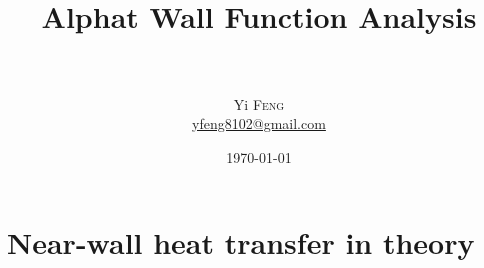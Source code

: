 \documentclass{article}
\title{
        \horrule{2pt} \\[0.5cm] %
        \Huge{Alphat Wall Function Analysis}\\
        \horrule{2pt} \\[0.5cm] %
        } %
\author{
        \Large{Yi \textsc{Feng}}\\
        \href{mailto:yfeng8102@gmail.com}{yfeng8102@gmail.com}
        } %
\date{\today} %
\begin{document}
\maketitle %
\thispagestyle{empty}

\cleardoublepage
{}
\tableofcontents %


\cleardoublepage
{}

\section{Near-wall heat transfer in theory}








\end{document}
